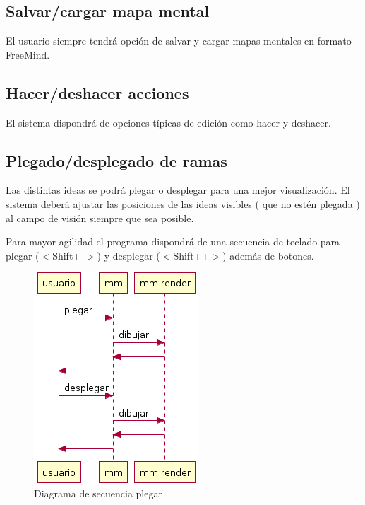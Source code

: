 \subsection{Salvar/cargar mapa mental}
El usuario siempre tendrá opción de salvar y cargar mapas mentales en formato FreeMind. 

\subsection{Hacer/deshacer acciones}
El sistema dispondrá de opciones típicas de edición como hacer y deshacer.

\subsection{Plegado/desplegado de ramas}
Las distintas ideas se podrá plegar o desplegar para una mejor visualización. El sistema deberá ajustar las posiciones de las ideas visibles ( que no estén plegada ) al campo de visión siempre que sea posible. 

Para mayor agilidad el programa dispondrá de una secuencia de teclado para plegar ($<$Shift+-$>$) y desplegar ($<$Shift++$>$) además de botones. 

\begin{figure}[tbph]
\centering
\includegraphics[width=0.3\linewidth]{imagenes/diagrama-seq-plegar}
\caption{Diagrama de secuencia plegar}
\label{fig:diagrama-seq-plegar}
\end{figure}

